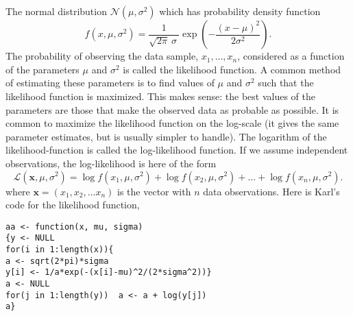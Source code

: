 \documentclass[a4paper]{article}
\begin{document}
\begin{enumerate}




\end{enumerate}

 
\section{}
The normal distribution $\mathcal{N}(\mu, \sigma^2)$ which has probability density function
\begin{equation*}
  \label{eq:3}
    f(x, \mu,\sigma^2) = \frac{1}{\sqrt{2\pi}\ \sigma\ } \exp{\left(-\frac {(x-\mu)^2}{2\sigma^2} \right)}.   
\end{equation*}
The probability of observing the data sample, $x_1,\ldots,x_n$, considered as a function of
the parameters $\mu$ and $\sigma^2$ is called the likelihood function. A common method of
estimating these parameters is to find values of  $\mu$ and $\sigma^2$ such that the
likelihood function is maximized. This makes sense: the best values of the parameters are
those that make the observed data as probable as possible. It is common to maximize the
likelihood function on the log-scale (it gives the same parameter estimates, but is
usually simpler to handle). The logarithm of the likelihood-function is called the
log-likelihood function. If we assume independent observations, the log-likelihood is here
of the form
\begin{equation*}
  \label{eq:4}
    \mathcal{L}(\mathbf{x}, \mu,\sigma^2) = \log f( x_{1}, \mu,
    \sigma^2) + \log f( x_{2}, \mu, \sigma^2) + ... + \log f( x_{n}, \mu, \sigma^2).
\end{equation*}
where $\mathbf{x} = (x_1,x_2,...x_n)$ is the vector with $n$ data observations. Here is Karl's code for the likelihood function,

\begin{linenumbers}
\begin{verbatim}
aa <- function(x, mu, sigma)
{y <- NULL
for(i in 1:length(x)){
a <- sqrt(2*pi)*sigma
y[i] <- 1/a*exp(-(x[i]-mu)^2/(2*sigma^2))}
a <- NULL
for(j in 1:length(y))  a <- a + log(y[j]) 
a}
\end{verbatim}
\end{linenumbers}
\end{document}

